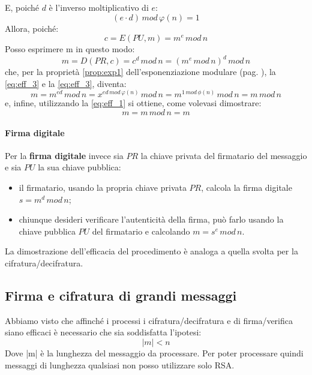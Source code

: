 E, poiché $d$ è l'inverso moltiplicativo di $e$:
\begin{equation} \label{eq:eff_3}
(e \cdot d) \, mod \, \varphi(n) = 1
\end{equation}
Allora, poiché:
\begin{equation}
c=E(PU,m) = m^e \, mod \, n
\end{equation}
Posso esprimere m in questo modo:
\begin{equation}
m=D(PR,c) = c^d \, mod \, n = (m^e \, mod \, n)^d \, mod \, n
\end{equation}
che, per la proprietà \ref{prop:exp1} dell'esponenziazione modulare (pag. \pageref{prop:exp1}), la \ref{eq:eff_3} e la \ref{eq:eff_3}, diventa:
\begin{equation}
m =  m^{ed} \, mod \, n = x^{ed \, mod \, \varphi(n)} \, mod \, n = m^{1 \, mod \, \phi(n)} \, mod \, n = m \, mod \, n
\end{equation}
e, infine, utilizzando la \ref{eq:eff_1} si ottiene, come volevasi dimostrare:
\begin{equation}
m = m \, mod \, n = m
\end{equation}

\paragraph{Firma digitale}
Per la \textbf{firma digitale} invece sia $PR$ la chiave privata del firmatario del messaggio e sia $PU$ la sua chiave pubblica: 
\begin{itemize}
\item il firmatario, usando la propria chiave privata $PR$, calcola la firma digitale $s = m^d \, mod \, n$;
\item chiunque desideri verificare l'autenticità della firma, può farlo usando la chiave pubblica $PU$ del firmatario e calcolando $m = s^e \, mod \, n$.
\end{itemize}
La dimostrazione dell'efficacia del procedimento è analoga a quella svolta per la cifratura/decifratura.

\subsection{Firma e cifratura di grandi messaggi} Abbiamo visto che affinché i processi i cifratura/decifratura e di firma/verifica siano efficaci è necessario che sia soddisfatta l'ipotesi:
\begin{equation}
|m| < n
\end{equation}
Dove |m| è la lunghezza del messaggio da processare. Per poter processare quindi messaggi di lunghezza qualsiasi non posso utilizzare solo RSA.

